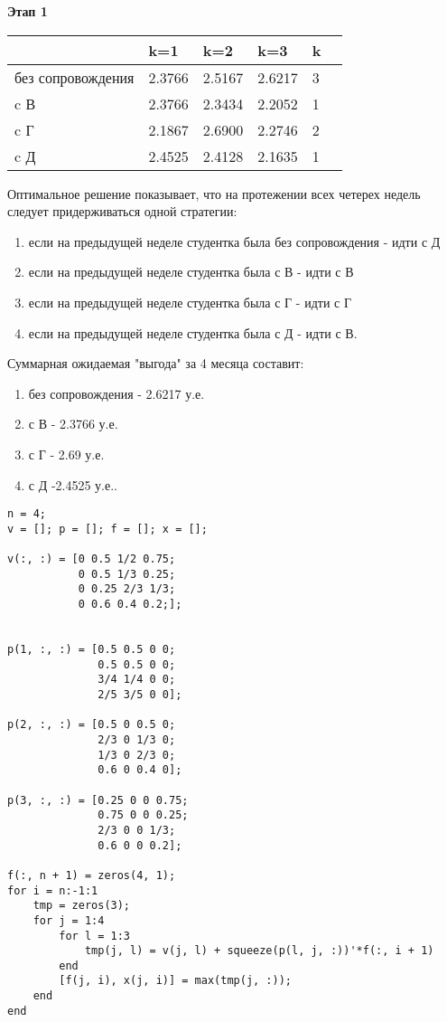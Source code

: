 \documentclass[14pt,a4paper,report]{report}
\begin{document}
\textbf{Этап 1}
	\begin{table}[h!]
\begin{tabular}{|l|l|l|l|l|l|}
\hline	 
	 &	 k=1  &  k=2 &   k=3   & k \\ \hline

     без сопровождения  &  2.3766  &  2.5167 &    2.6217 & 3\\
    c В   &  2.3766  &  2.3434 &    2.2052 & 1 \\
      c Г   &  2.1867  &  2.6900 &    2.2746 & 2\\ 
        c Д   &  2.4525  &  2.4128 &    2.1635 & 1\\ \hline
         \end{tabular}
\end{table}


Оптимальное решение показывает, что на протежении всех четерех недель следует придерживаться одной стратегии:
\begin{enumerate}
    \item если на предыдущей неделе студентка была без сопровождения - идти с Д
    \item если на предыдущей неделе студентка была с В - идти с В
    \item если на предыдущей неделе студентка была с Г - идти с Г
    \item если на предыдущей неделе студентка была с Д - идти с В. 
\end{enumerate}


Суммарная ожидаемая "выгода" за 4 месяца составит:
\begin{enumerate}
    \item без сопровождения - 2.6217 у.е.
    \item с В - 2.3766 у.е.
    \item с Г - 2.69 у.е.
    \item с Д -2.4525 у.е..
\end{enumerate}    

\begin{lstlisting}[caption = {Полный скрипт Matlab}]
n = 4;
v = []; p = []; f = []; x = [];

v(:, :) = [0 0.5 1/2 0.75;
           0 0.5 1/3 0.25;
           0 0.25 2/3 1/3;
           0 0.6 0.4 0.2;];


p(1, :, :) = [0.5 0.5 0 0;
              0.5 0.5 0 0;
              3/4 1/4 0 0;
              2/5 3/5 0 0];
              
p(2, :, :) = [0.5 0 0.5 0;
              2/3 0 1/3 0;
              1/3 0 2/3 0;
              0.6 0 0.4 0];
              
p(3, :, :) = [0.25 0 0 0.75;
              0.75 0 0 0.25;
              2/3 0 0 1/3;
              0.6 0 0 0.2];

f(:, n + 1) = zeros(4, 1);
for i = n:-1:1
    tmp = zeros(3);
    for j = 1:4
        for l = 1:3
            tmp(j, l) = v(j, l) + squeeze(p(l, j, :))'*f(:, i + 1)
        end
        [f(j, i), x(j, i)] = max(tmp(j, :));
    end
end
\end{lstlisting}
\end{document}
